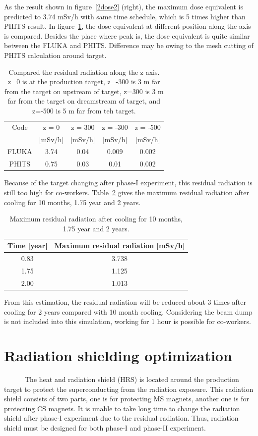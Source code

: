 As the result shown in figure~\ref{2dose2} (right), the maximum dose equivalent is predicted to 3.74 mSv/h with same time schedule, which is 5 times higher than PHITS result.
In figure~\ref{dosepo}, the dose equivalent at different position along the axis is compared.
Besides the place where peak is, the dose equivalent is quite similar between the FLUKA and PHITS.
Difference may be owing to the mesh cutting of PHITS calculation around target.
 \begin{table}[H]
 \centering
 \begin{tabular}{ccccc} \hline \hline
  Code & z = 0 & z = 300 & z = -300 & z = -500 \\
   & [mSv/h] & [mSv/h] & [mSv/h] & [mSv/h] \\ \hline
  FLUKA & 3.74 & 0.04 & 0.009 & 0.002 \\
  PHITS & 0.75 & 0.03 & 0.01 & 0.002 \\ \hline \hline
 \end{tabular}
 \caption{Compared the residual radiation along the z axis. z=0 is at the production target, z=-300 is 3 m far from the target on upstream of target, z=300 is 3 m far from the target on dreamstream of target, and z=-500 is 5 m far from teh target.}
 \label{dosepo}
\end{table}
Because of the target changing after phase-I experiment, this residual radiation is still too high for co-workers.
Table~\ref{2time} gives the maximum residual radiation after cooling for 10 months, 1.75 year and 2 years.
\begin{table}[H]
 \centering
 \begin{tabular}{cc} \hline \hline
  Time [year] & Maximum residual radiation [mSv/h] \\ \hline
  0.83 & 3.738 \\
  1.75 & 1.125 \\
  2.00 & 1.013 \\ \hline \hline
 \end{tabular}
 \caption{Maximum residual radiation after cooling for 10 months, 1.75 year and 2 years.}
 \label{2time}
\end{table}
From this estimation, the residual radiation will be reduced about 3 times after cooling for 2 years compared with 10 month cooling.
Considering the beam dump is not included into this simulation, working for 1 hour is possible for co-workers.

 \section{Radiation shielding optimization}
~~~~~~The heat and radiation shield (HRS) is located around the production target to protect the superconducting from the radiation exposure.
This radiation shield consists of two parts, one is for protecting MS magnets, another one is for protecting CS magnets.
It is unable to take long time to change the radiation shield after phase-I experiment due to the residual radiation.
Thus, radiation shield must be designed for both phase-I and phase-II experiment.

